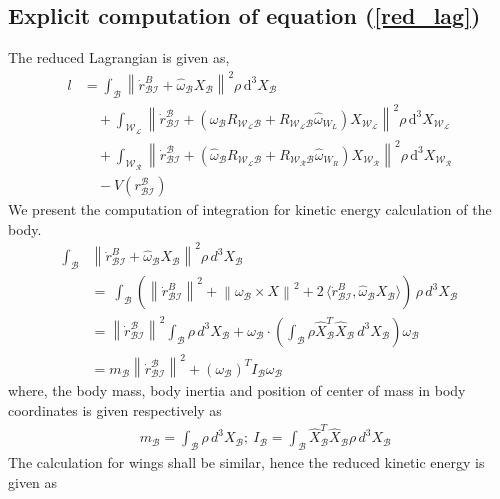 \documentclass[letterpaper, 10 pt, conference]{ieeeconf}  \newcommand{\RN}[1]{\textup{\uppercase\expandafter{\romannumeral#1}}}
\newcommand{\norm}[1]{\left\lVert{#1}\right\rVert}
\begin{document}
\subsection{Explicit computation of equation (\ref{red_lag}) }\label{KE computation}
The reduced Lagrangian is given as,
\begin{align*}
l&  = \int_\mathcal{B}\norm{\dot{r}_{\mathcal{BI}}^{B}+\widehat{\omega}_\mathcal{B}X_{\mathcal{B}}}^2\rho \, \mathrm d^3X_{\mathcal{B}} \\
& \quad + \int_\mathcal{W_L} \norm{\dot{r}_\mathcal{BI}^{\mathcal{B}}+ (\widehat{\omega}_\mathcal{B} R_{\mathcal{W_LB}} + R_{\mathcal{W_LB}} \widehat{\omega}_{W_L}) X_\mathcal{W_L}}^2\rho \, \mathrm d^3X_{\mathcal{W_L}} \\
& \quad + \int_\mathcal{W_R} \norm{\dot{r}_\mathcal{BI}^{\mathcal{B}}+ (\widehat{\omega}_\mathcal{B} R_{\mathcal{W_LB}} + R_{\mathcal{W_RB}} \widehat{\omega}_{W_R}) X_\mathcal{W_R}}^2\rho \, \mathrm d^3X_{\mathcal{W_R}} \\
& \quad - V(r_{\mathcal{BI}}^{\mathcal{B}})
\end{align*}
We present the computation of integration for kinetic energy calculation of the body. 
\begin{align*}
\int_\mathcal{B} & \norm{\dot{r}_{\mathcal{BI}}^{B}+\widehat{\omega}_\mathcal{B}X_{\mathcal{B}}}^2\rho \,d^3X_{\mathcal{B}}\:
\\
&=\:\int_\mathcal{B}\left( \norm{\dot{r}_{\mathcal{BI}}^{B}}^2+\norm{\omega_\mathcal{B}\times X}^2 + 2 \, \langle \dot{r}_{\mathcal{BI}}^{B},\widehat{\omega}_\mathcal{B} X_{\mathcal{B}} \rangle \right)  \, \rho \, d^3X_{\mathcal{B}} \\
&=\norm{\dot{r}_{\mathcal{BI}}^{\mathcal{B}}}^2 \int_\mathcal{B}\rho \, d^3X_{\mathcal{B}} + \omega_\mathcal{B} \cdot \left( \int_\mathcal{B} \rho \hat{X}_{\mathcal{B}}^T \hat{X}_{\mathcal{B}} \, d^3X_{\mathcal{B}} \right)  \omega_\mathcal{B}
\\
&=m_\mathcal{B} \norm{\dot{r}_{\mathcal{BI}}^{\mathcal{B}}}^2 + (\omega_\mathcal{B})^TI_\mathcal{B}\omega_\mathcal{B}
\end{align*}
where, the body mass, body inertia and position of center of mass in body coordinates is given respectively as
\begin{align*}
&m_\mathcal{B}=\int_\mathcal{B} \rho \, d^3X_{\mathcal{B}}; \: I_\mathcal{B}=\int_\mathcal{B}\widehat{X}_{\mathcal{B}}^{T}\widehat{X}_{\mathcal{B}}\rho \, d^3X_{\mathcal{B}}
\end{align*}
The calculation for wings shall be similar, hence the reduced kinetic energy is given as
\end{document}
